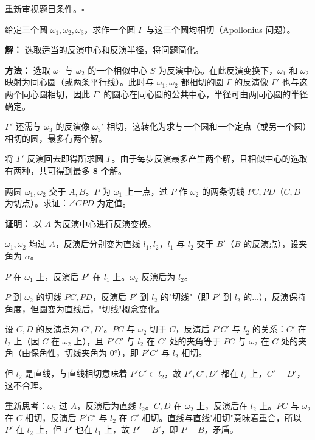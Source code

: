 \documentclass[12pt, a4paper]{ctexart}
\begin{document}
重新审视题目条件。$\square$

\begin{examplebox}
给定三个圆 $\omega_1, \omega_2, \omega_3$，求作一个圆 $\Gamma$ 与这三个圆均相切（Apollonius 问题）。
\end{examplebox}

\textbf{解：} 选取适当的反演中心和反演半径，将问题简化。

\textbf{方法：} 选取 $\omega_1$ 与 $\omega_2$ 的一个相似中心 $S$ 为反演中心。在此反演变换下，$\omega_1$ 和 $\omega_2$ 映射为同心圆（或两条平行线）。此时与 $\omega_1, \omega_2$ 都相切的圆 $\Gamma$ 的反演像 $\Gamma'$ 也与这两个同心圆相切，因此 $\Gamma'$ 的圆心在同心圆的公共中心，半径可由两同心圆的半径确定。

$\Gamma'$ 还需与 $\omega_3$ 的反演像 $\omega_3'$ 相切，这转化为求与一个圆和一个定点（或另一个圆）相切的圆，最多有两个解。

将 $\Gamma'$ 反演回去即得所求圆 $\Gamma$。由于每步反演最多产生两个解，且相似中心的选取有两种，共可得到最多 \textbf{8 个}解。

\begin{examplebox}[【例题9】保角性应用]
两圆 $\omega_1, \omega_2$ 交于 $A, B$。$P$ 为 $\omega_1$ 上一点，过 $P$ 作 $\omega_2$ 的两条切线 $PC, PD$（$C, D$ 为切点）。求证：$\angle CPD$ 为定值。
\end{examplebox}

\textbf{证明：} 以 $A$ 为反演中心进行反演变换。

$\omega_1, \omega_2$ 均过 $A$，反演后分别变为直线 $l_1, l_2$，$l_1$ 与 $l_2$ 交于 $B'$（$B$ 的反演点），设夹角为 $\alpha$。

$P$ 在 $\omega_1$ 上，反演后 $P'$ 在 $l_1$ 上。$\omega_2$ 反演后为 $l_2$。

$P$ 到 $\omega_2$ 的切线 $PC, PD$，反演后 $P'$ 到 $l_2$ 的"切线"（即 $P'$ 到 $l_2$ 的...），反演保持角度，但圆变为直线后，"切线"概念变化。

设 $C, D$ 的反演点为 $C', D'$。$PC$ 与 $\omega_2$ 切于 $C$，反演后 $P'C'$ 与 $l_2$ 的关系：$C'$ 在 $l_2$ 上（因 $C$ 在 $\omega_2$ 上），且 $P'C'$ 与 $l_2$ 在 $C'$ 处的夹角等于 $PC$ 与 $\omega_2$ 在 $C$ 处的夹角（由保角性，切线夹角为 $0°$），即 $P'C'$ 与 $l_2$ 相切。

但 $l_2$ 是直线，与直线相切意味着 $P'C' \subset l_2$，故 $P', C', D'$ 都在 $l_2$ 上，$C' = D'$，这不合理。

重新思考：$\omega_2$ 过 $A$，反演后为直线 $l_2$。$C, D$ 在 $\omega_2$ 上，反演后在 $l_2$ 上。$PC$ 与 $\omega_2$ 在 $C$ 相切，反演后 $P'C'$ 与 $l_2$ 在 $C'$ 相切。直线与直线"相切"意味着重合，所以 $P'$ 在 $l_2$ 上，但 $P'$ 也在 $l_1$ 上，故 $P' = B'$，即 $P = B$，矛盾。
\end{document}
